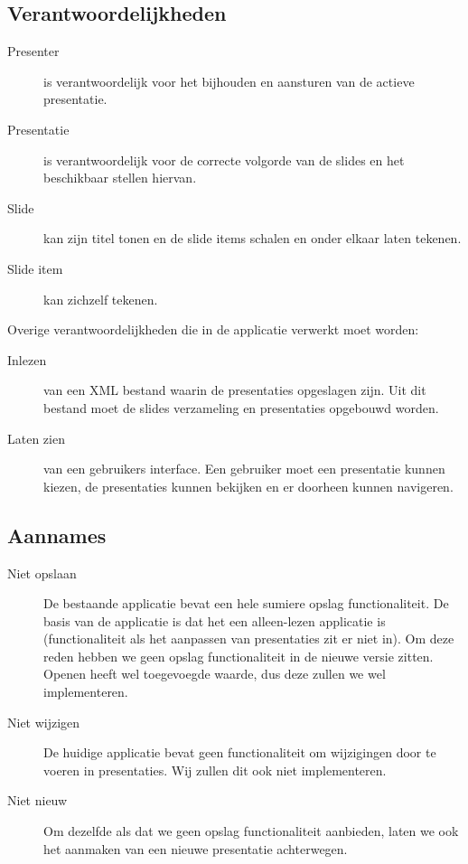 \documentclass[a4paper]{article}
\begin{document}
\subsection{Verantwoordelijkheden}
\begin{description}
\item[Presenter] is verantwoordelijk voor het bijhouden en aansturen van de actieve presentatie. 
\item[Presentatie] is verantwoordelijk voor de correcte volgorde van de slides en het beschikbaar stellen hiervan. 
\item[Slide] kan zijn titel tonen en de slide items schalen en onder elkaar laten tekenen.
\item[Slide item] kan zichzelf tekenen.
\end{description}
Overige verantwoordelijkheden die in de applicatie verwerkt moet worden:
\begin{description}
\item[Inlezen] van een XML bestand waarin de presentaties opgeslagen zijn. Uit dit bestand moet de slides verzameling en presentaties opgebouwd worden.
\item[Laten zien] van een gebruikers interface. Een gebruiker moet een presentatie kunnen kiezen, de presentaties kunnen bekijken en er doorheen kunnen navigeren.
\end{description}

\subsection{Aannames}
\begin{description}
\item[Niet opslaan] De bestaande applicatie bevat een hele sumiere opslag functionaliteit. De basis van de applicatie is dat het een alleen-lezen applicatie is (functionaliteit als het aanpassen van presentaties zit er niet in). Om deze reden hebben we geen opslag functionaliteit in de nieuwe versie zitten. Openen heeft wel toegevoegde waarde, dus deze zullen we wel implementeren.
\item[Niet wijzigen] De huidige applicatie bevat geen functionaliteit om wijzigingen door te voeren in presentaties. Wij zullen dit ook niet implementeren.
\item[Niet nieuw] Om dezelfde als dat we geen opslag functionaliteit aanbieden, laten we ook het aanmaken van een nieuwe presentatie achterwegen.
\end{description}
\end{document}
